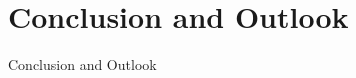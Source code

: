 \documentclass{beamer}
\begin{document}
\section{Conclusion and Outlook}
\begin{frame}[t]{Conclusion and Outlook}
\end{frame}

\end{document}
